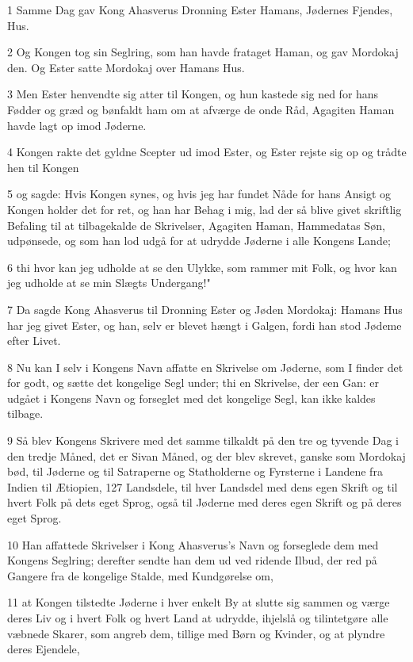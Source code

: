 \par 1 Samme Dag gav Kong Ahasverus Dronning Ester Hamans, Jødernes Fjendes, Hus.
\par 2 Og Kongen tog sin Seglring, som han havde frataget Haman, og gav Mordokaj den. Og Ester satte Mordokaj over Hamans Hus.
\par 3 Men Ester henvendte sig atter til Kongen, og hun kastede sig ned for hans Fødder og græd og bønfaldt ham om at afværge de onde Råd, Agagiten Haman havde lagt op imod Jøderne.
\par 4 Kongen rakte det gyldne Scepter ud imod Ester, og Ester rejste sig op og trådte hen til Kongen
\par 5 og sagde: Hvis Kongen synes, og hvis jeg har fundet Nåde for hans Ansigt og Kongen holder det for ret, og han har Behag i mig, lad der så blive givet skriftlig Befaling til at tilbagekalde de Skrivelser, Agagiten Haman, Hammedatas Søn, udpønsede, og som han lod udgå for at udrydde Jøderne i alle Kongens Lande;
\par 6 thi hvor kan jeg udholde at se den Ulykke, som rammer mit Folk, og hvor kan jeg udholde at se min Slægts Undergang!"
\par 7 Da sagde Kong Ahasverus til Dronning Ester og Jøden Mordokaj: Hamans Hus har jeg givet Ester, og han, selv er blevet hængt i Galgen, fordi han stod Jødeme efter Livet.
\par 8 Nu kan I selv i Kongens Navn affatte en Skrivelse om Jøderne, som I finder det for godt, og sætte det kongelige Segl under; thi en Skrivelse, der een Gan: er udgået i Kongens Navn og forseglet med det kongelige Segl, kan ikke kaldes tilbage.
\par 9 Så blev Kongens Skrivere med det samme tilkaldt på den tre og tyvende Dag i den tredje Måned, det er Sivan Måned, og der blev skrevet, ganske som Mordokaj bød, til Jøderne og til Satraperne og Statholderne og Fyrsterne i Landene fra Indien til Ætiopien, 127 Landsdele, til hver Landsdel med dens egen Skrift og til hvert Folk på dets eget Sprog, også til Jøderne med deres egen Skrift og på deres eget Sprog.
\par 10 Han affattede Skrivelser i Kong Ahasverus's Navn og forseglede dem med Kongens Seglring; derefter sendte han dem ud ved ridende Ilbud, der red på Gangere fra de kongelige Stalde, med Kundgørelse om,
\par 11 at Kongen tilstedte Jøderne i hver enkelt By at slutte sig sammen og værge deres Liv og i hvert Folk og hvert Land at udrydde, ihjelslå og tilintetgøre alle væbnede Skarer, som angreb dem, tillige med Børn og Kvinder, og at plyndre deres Ejendele,
